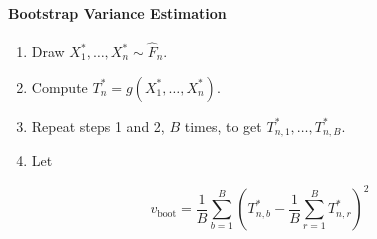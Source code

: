 \paragraph{Bootstrap Variance
Estimation}\label{bootstrap:variance}
\begin{enumerate}[tightlist,label={\arabic*.}]
\item
  Draw \(X_{1}^{*}, \dots, X_{n}^{*} \sim \hat{F}_{n}\).
\item
  Compute \(T_{n}^{*} = g(X_{1}^{*}, \dots, X_{n}^{*})\).
\item
  Repeat steps 1 and 2, \(B\) times, to get
  \(T_{n, 1}^{*}, \dots, T_{n, B}^{*}\).
\item
  Let
\end{enumerate}
\[
v_{\text{boot}} = \frac{1}{B} \sum_{b=1}^B \left( T_{n, b}^{*} - \frac{1}{B} \sum_{r=1}^B T_{n, r}^{*} \right)^{2}
\]

